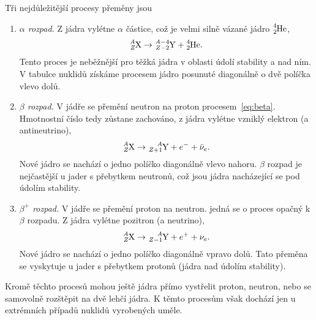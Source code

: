 \documentclass[a4paper,12pt,oneside]{article}
\theoremstyle{red}
\begin{document}
        Tři nejdůležitější procesy přeměny jsou
        \begin{enumerate}
            \item\emph{$\alpha$ rozpad.}
                Z jádra vylétne $\alpha$ částice, což je velmi silně vázané jádro $\ce{^{4}_{2}He}$,
                \begin{equation}
                    \ce{^{\it A}_{\it Z}X}\rightarrow\ce{^{{\it A}-4}_{{\it Z}-2}Y}+\ce{^{4}_{2}He}.
                \end{equation}
                Tento proces je neběžnější pro těžká jádra v oblasti údolí stability a nad ním.
                V tabulce nuklidů získáme procesem jádro posunuté diagonálně o dvě políčka vlevo dolů.

            \item\emph{$\beta$ rozpad.}
                V jádře se přemění neutron na proton procesem~\eqref{eq:beta}.
                Hmotnostní číslo tedy zůstane zachováno, z jádra vylétne vzniklý elektron (a antineutrino),
                \begin{equation}
                    \ce{^{\it A}_{\it Z}X}\rightarrow\ce{^{\it A}_{{\it Z}+1}Y}+e^{-}+\bar{\nu}_{e}.
                \end{equation}
                Nové jádro se nachází o jedno políčko diagonálně vlevo nahoru.
                $\beta$ rozpad je nejčastější u jader s přebytkem neutronů, což jsou jádra nacházející se pod údolím stability.
            
            \item\emph{$\beta^{+}$ rozpad.}
                V jádře se přemění proton na neutron.
                jedná se o proces opačný k $\beta$ rozpadu.
                Z jádra vylétne pozitron (a neutrino),
                \begin{equation}
                    \ce{^{\it A}_{\it Z}X}\rightarrow\ce{^{\it A}_{{\it Z}-1}Y}+e^{+}+\nu_{e}.                    
                \end{equation}
                Nové jádro se nachází o jedno políčko diagonálně vpravo dolů.
                Tato přeměna se vyskytuje u jader s přebytkem protonů (jádra nad údolím stability).
        \end{enumerate}

        Kromě těchto procesů mohou ještě jádra přímo vystřelit proton, neutron, nebo se samovolně rozštěpit na dvě lehčí jádra.
        K těmto procesům však dochází jen u extrémních případů nuklidů vyrobených uměle.
\end{document}
